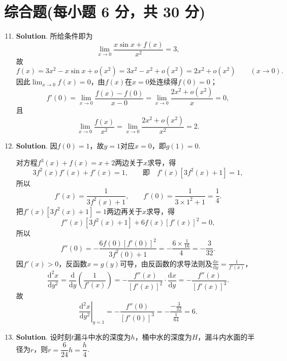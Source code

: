\documentclass[../main.tex]{subfiles}
\begin{document}
\section{综合题(每小题 6 分，共 30 分)}
\begin{enumerate}
    \setcounter{enumi}{10}
    \item \textbf{Solution}. 所给条件即为
          \[
              \lim_{x\to0}\frac{x\sin x+f(x)}{x^{2}}=3,
          \]
          故
          \[
              f(x)=3x^{2}-x\sin x+o\left(x^{2}\right)=3x^{2}-x^{2}+o\left(x^{2}\right)=2x^{2}+o\left(x^{2}\right)\qquad(x\to0).
          \]
          因此$\lim_{x\to0}f(x)=0$，由$f(x)$在$x=0$处连续得$f(0)=0$；
          \[
              f'(0)=\lim_{x\to0}\frac{f(x)-f(0)}{x-0}=\lim_{x\to0}\frac{2x^{2}+o\left(x^{2}\right)}{x}=0,
          \]
          且
          \[
              \lim_{x\to0}\frac{f(x)}{x^{2}}=\lim_{x\to0}\frac{2x^{2}+o\left(x^{2}\right)}{x^{2}}=2.
          \]

    \item \textbf{Solution}. 因$f(0)=1$，故$y=1$对应$x=0$，即$g(1)=0$.

          对方程$f^{3}(x)+f(x)=x+2$两边关于$x$求导，得
          \[
              3f^{2}(x)f'(x)+f'(x)=1,\qquad\text{即}\quad f'(x)\left[3f^{2}(x)+1\right]=1,
          \]
          所以
          \[
              f'(x)=\frac{1}{3f^{2}(x)+1},\qquad f'(0)=\frac{1}{3\times1^{2}+1}=\frac{1}{4}.
          \]
          把$f'(x)\left[3f^{2}(x)+1\right]=1$两边再关于$x$求导，得
          \[
              f''(x)\left[3f^{2}(x)+1\right]+6f(x)\left[f'(x)\right]^{2}=0,
          \]
          所以
          \[
              f''(0)=-\frac{6f(0)\left[f'(0)\right]^{2}}{3f^{2}(0)+1}=-\frac{6\times\frac{1}{16}}{4}=-\frac{3}{32}.
          \]
          因$f'(x)>0$，反函数$x=g(y)$可导，由反函数的求导法则及$\frac{\mathrm{d}x}{\mathrm{d}y}=\frac{1}{f'(x)}$，
          \[
              \frac{\mathrm{d}^{2}x}{\mathrm{d}y^{2}}=\frac{\mathrm{d}}{\mathrm{d}y}\left(\frac{1}{f'(x)}\right)
              =-\frac{f''(x)}{\left[f'(x)\right]^{2}}\cdot\frac{\mathrm{d}x}{\mathrm{d}y}
              =-\frac{f''(x)}{\left[f'(x)\right]^{3}}.
          \]
          故
          \[
              \left.\frac{\mathrm{d}^{2}x}{\mathrm{d}y^{2}}\right|_{y=1}=-\frac{f''(0)}{\left[f'(0)\right]^{3}}
              =-\frac{-\frac{3}{32}}{\frac{1}{64}}=6.
          \]

    \item \textbf{Solution}. 设时刻$t$漏斗中水的深度为$h$，桶中水的深度为$H$，漏斗内水面的半径为$r$，则$r=\dfrac{6}{24}h=\dfrac{h}{4}$.


\end{enumerate}
\end{document}
